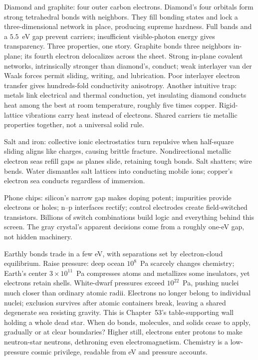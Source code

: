 Diamond and graphite: four outer carbon electrons. Diamond's four orbitals form strong tetrahedral bonds with neighbors. They fill bonding states and lock a three-dimensional network in place, producing supreme hardness. Full bands and a \(5.5\)~eV gap prevent carriers; insufficient visible-photon energy gives transparency. Three properties, one story. Graphite bonds three neighbors in-plane; its fourth electron delocalizes across the sheet. Strong in-plane covalent networks, intrinsically stronger than diamond's, conduct; weak interlayer van der Waals forces permit sliding, writing, and lubrication. Poor interlayer electron transfer gives hundreds-fold conductivity anisotropy. Another intuitive trap: metals link electrical and thermal conduction, yet insulating diamond conducts heat among the best at room temperature, roughly five times copper. Rigid-lattice vibrations carry heat instead of electrons. Shared carriers tie metallic properties together, not a universal solid rule.

Salt and iron: collective ionic electrostatics turn repulsive when half-square sliding aligns like charges, causing brittle fracture. Nondirectional metallic electron seas refill gaps as planes slide, retaining tough bonds. Salt shatters; wire bends. Water dismantles salt lattices into conducting mobile ions; copper's electron sea conducts regardless of immersion.

Phone chips: silicon's narrow gap makes doping potent; impurities provide electrons or holes; n--p interfaces rectify; control electrodes create field-switched transistors. Billions of switch combinations build logic and everything behind this screen. The gray crystal's apparent decisions come from a roughly one-eV gap, not hidden machinery.


\begin{thought}
Earthly bonds trade in a few eV, with separations set by electron-cloud equilibrium. Raise pressure: deep ocean \(10^{8}\)~Pa scarcely changes chemistry; Earth's center \(3\times10^{11}\)~Pa compresses atoms and metallizes some insulators, yet electrons retain shells. White-dwarf pressures exceed \(10^{22}\)~Pa, pushing nuclei much closer than ordinary atomic radii. Electrons no longer belong to individual nuclei; exclusion survives after atomic containers break, leaving a shared degenerate sea resisting gravity. This is Chapter~53's table-supporting wall holding a whole dead star. When do bonds, molecules, and solids cease to apply, gradually or at clear boundaries? Higher still, electrons enter protons to make neutron-star neutrons, dethroning even electromagnetism. Chemistry is a low-pressure cosmic privilege, readable from eV and pressure accounts.
\end{thought}

